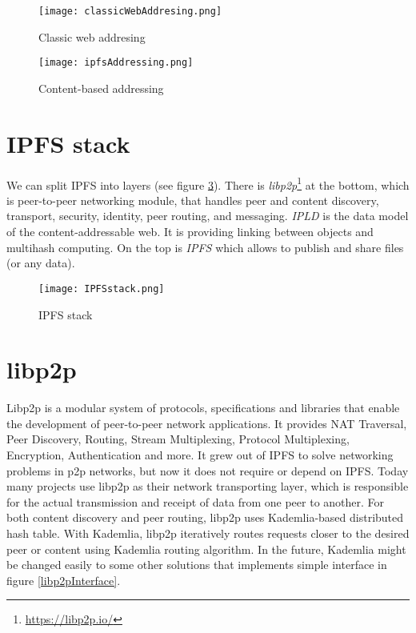 \begin{figure}[h]
    \centering
    \texttt{[image: classicWebAddresing.png]}
    \caption{Classic web addresing}
    \label{webAddressing}
\end{figure}

\begin{figure}[h]
    \centering
    \texttt{[image: ipfsAddressing.png]}
    \caption{Content-based addressing}
    \label{ipfsAddressing}
\end{figure}

\section{IPFS stack}
We can split IPFS into layers (see figure \ref{IPFSstack}). There is \textit{libp2p}\footnote{\url{https://libp2p.io/}} at the bottom, which is peer-to-peer networking module, that handles peer and content discovery, transport, security, identity, peer routing, and messaging. \textit{IPLD} is the data model of the content-addressable web. It is providing linking between objects and multihash computing. On the top is \textit{IPFS} which allows to publish and share files (or any data).\cite{IPFSwhitepaper}


\begin{figure}[h]
    \centering
    \texttt{[image: IPFSstack.png]}
    \caption{IPFS stack}
    \label{IPFSstack}
\end{figure}


\section{libp2p}
Libp2p is a modular system of protocols, specifications and libraries that enable the development of peer-to-peer network applications. It provides NAT Traversal, Peer Discovery, Routing, Stream Multiplexing, Protocol Multiplexing, Encryption, Authentication and more. It grew out of IPFS to solve networking problems in p2p networks, but now it does not require or depend on IPFS. Today many projects use libp2p as their network transporting layer, which is responsible for the actual transmission and receipt of data from one peer to another. For both content discovery and peer routing, libp2p uses Kademlia-based distributed hash table. With Kademlia, libp2p iteratively routes requests closer to the desired peer or content using Kademlia routing algorithm\cite{kademlia}. In the future, Kademlia might be changed easily to some other solutions that implements simple interface in figure \ref{libp2pInterface}.\cite{WebEngineering}



